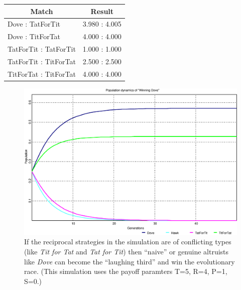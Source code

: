 \begin{center}
\begin{tabular}{l|r}
\multicolumn{1}{c}{Match} & \multicolumn{1}{c}{Result} \\ \hline

Dove : TatForTit          &  3.980 : 4.005 \\
Dove : TitForTat          &  4.000 : 4.000 \\
TatForTit : TatForTit     &  1.000 : 1.000 \\
TatForTit : TitForTat     &  2.500 : 2.500 \\
TitForTat : TitForTat     &  4.000 : 4.000 \\
\end{tabular}
\end{center}

\begin{figure}
\begin{center}
\includegraphics[width=20cm]{images/winningDove.eps} %
\caption{\label{winningDove} If the reciprocal strategies in the
  simulation are of conflicting types (like {\em Tit for Tat} and {\em
    Tat for Tit}) then ``naive'' or genuine altruists like {\em Dove}
  can become the ``laughing third'' and win the evolutionary race. (This
simulation uses the payoff paramters T=5, R=4, P=1, S=0.)}
\end{center}
\end{figure}

